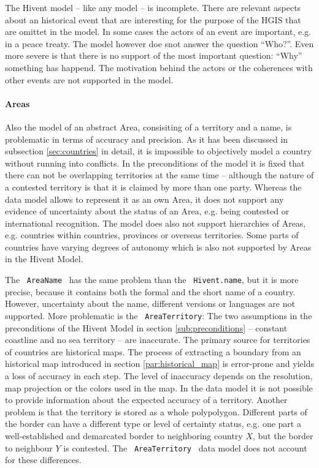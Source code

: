 The Hivent model -- like any model -- is incomplete. There are relevant aspects about an historical event that are interesting for the purpose of the HGIS that are omittet in the model. In some cases the actors of an event are important, e.g. in a peace treaty. The model however doe snot answer the question ``Who?''. Even more severe is that there is no support of the most important question: ``Why'' something has happend. The motivation behind the actors or the coherences with other events are not supported in the model.


\paragraph{Areas} %
\label{par:evaluation_areas}

Also the model of an abstract Area, consisiting of a territory and a name, is problematic in terms of accuracy and precision. As it has been discussed in subsection \ref{sec:countries} in detail, it is impossible to objectively model a country without running into conflicts.
In the preconditions of the model it is fixed that there can not be overlapping territories at the same time -- although the nature of a contested territory is that it is claimed by more than one party. Whereas the data model allows to represent it as an own Area, it does not support any evidence of uncertainty about the status of an Area, e.g. being contested or international recognition.
The model does also not support hierarchies of Areas, e.g. countries within countries, provinces or overseas territories. Some parts of countries have varying degrees of autonomy which is also not supported by Areas in the Hivent Model.

The ~\texttt{AreaName}~ has the same problem than the ~\texttt{Hivent.name}, but it is more precise, because it contains both the formal and the short name of a country. However, uncertainty about the name, different versions or languages are not supported. More problematic is the ~\texttt{AreaTerritory}: The two assumptions in the preconditions of the Hivent Model in section \ref{sub:preconditions} -- constant coastline and no sea territory -- are inaccurate. The primary source for territories of countries are historical maps. The process of extracting a boundary from an historical map introduced in section \ref{par:historical_map} is error-prone and yields a loss of accuracy in each step. The level of inaccuracy depends on the resolution, map projection or the colors used in the map. In the data model it is not possible to provide information about the expected accuracy of a territory. Another problem is that the territory is stored as a whole polypolygon. Different parts of the border can have a different type or level of certainty status, e.g. one part a well-established and demarcated border to neighboring country $X$, but the border to neighbour $Y$ is contested. The ~\texttt{AreaTerritory}~ data model does not account for these differences.

